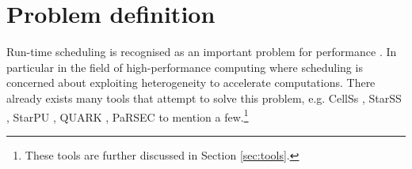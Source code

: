 \documentclass[preprint,10pt,numbers]{sigplanconf}
\begin{document}



  \section{Problem definition}\label{sec:problemdefinition}
Run-time scheduling is recognised as an important problem for performance \cite{Augonnet2011,Augonnet2012,Agullo2015}. In particular in the field of high-performance computing where scheduling is concerned about exploiting heterogeneity to accelerate computations. There already exists many tools that attempt to solve this problem, e.g. CellSs \cite{Bellens2009}, StarSS \cite{Planas2009}, StarPU \cite{Augonnet2011}, QUARK \cite{YarKhan2011}, PaRSEC \cite{Bosilca2013} to mention a few.\footnote{These tools are further discussed in Section \ref{sec:tools}.}
\end{document}
